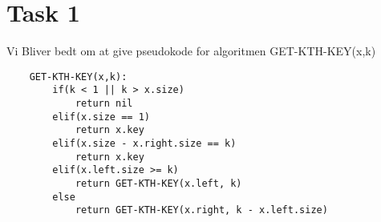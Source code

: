 \section{Task 1}
Vi Bliver bedt om at give pseudokode for algoritmen GET-KTH-KEY(x,k)
\begin{lstlisting}
	GET-KTH-KEY(x,k):
		if(k < 1 || k > x.size)
			return nil
		elif(x.size == 1)
			return x.key
		elif(x.size - x.right.size == k)
			return x.key
		elif(x.left.size >= k)
			return GET-KTH-KEY(x.left, k)
		else
			return GET-KTH-KEY(x.right, k - x.left.size)
\end{lstlisting}

